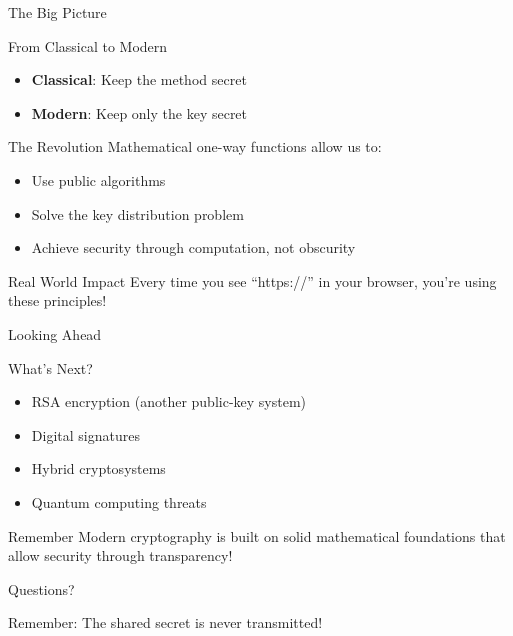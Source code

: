 \documentclass{beamer}
\begin{document}
\begin{frame}{The Big Picture}
\begin{block}{From Classical to Modern}
\begin{itemize}
    \item \textbf{Classical}: Keep the method secret
    \item \textbf{Modern}: Keep only the key secret
\end{itemize}
\end{block}

\pause

\begin{block}{The Revolution}
Mathematical one-way functions allow us to:
\begin{itemize}
    \item Use public algorithms
    \item Solve the key distribution problem
    \item Achieve security through computation, not obscurity
\end{itemize}
\end{block}

\pause

\begin{exampleblock}{Real World Impact}
Every time you see ``https://'' in your browser, you're using these principles!
\end{exampleblock}
\end{frame}

\begin{frame}{Looking Ahead}
\begin{block}{What's Next?}
\begin{itemize}
    \item RSA encryption (another public-key system)
    \item Digital signatures
    \item Hybrid cryptosystems
    \item Quantum computing threats
\end{itemize}
\end{block}

\pause

\begin{alertblock}{Remember}
Modern cryptography is built on solid mathematical foundations that allow security through transparency!
\end{alertblock}
\end{frame}

\begin{frame}
\begin{center}
{\Huge Questions?}

\vspace{1cm}

\large
Remember: The shared secret is never transmitted!
\end{center}
\end{frame}
\end{document}
